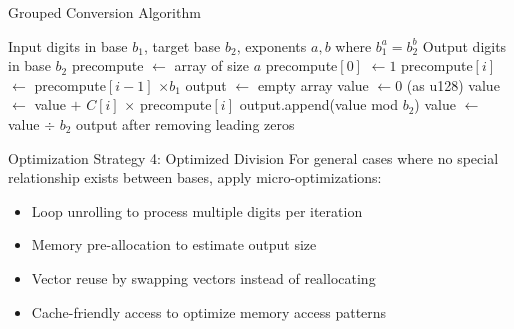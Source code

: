 \documentclass[10pt]{beamer}
\begin{document}
\begin{frame}[fragile]{Grouped Conversion Algorithm}
\begin{algorithm}[H]
\caption{Grouped Conversion for Aligned Bases}
\begin{algorithmic}[1]
\scriptsize
\REQUIRE Input digits in base $b_1$, target base $b_2$, exponents $a, b$ where $b_1^a = b_2^b$ \ENSURE Output digits in base $b_2$ \STATE precompute $\gets$ array of size $a$ \STATE precompute$[0]$ $\gets 1$ 
  \STATE precompute$[i]$ $\gets$ precompute$[i-1]$ $\times b_1$ \ENDFOR
\STATE output $\gets$ empty array
  \STATE value $\gets 0$ (as u128)
    \STATE value $\gets$ value $+$ $C[i]$ $\times$ precompute$[i]$   \ENDFOR
    \STATE output.append(value mod $b_2$)
    \STATE value $\gets$ value $\div$ $b_2$   \ENDFOR
\ENDFOR
\RETURN output after removing leading zeros
\end{algorithmic}
\end{algorithm}
\end{frame}

\begin{frame}{Optimization Strategy 4: Optimized Division}
For general cases where no special relationship exists between bases, apply micro-optimizations:

\vspace{0.3cm}
\begin{itemize}
\item Loop unrolling to process multiple digits per iteration
\item Memory pre-allocation to estimate output size
\item Vector reuse by swapping vectors instead of reallocating
\item Cache-friendly access to optimize memory access patterns
\end{itemize}
\end{frame}
\end{document}
